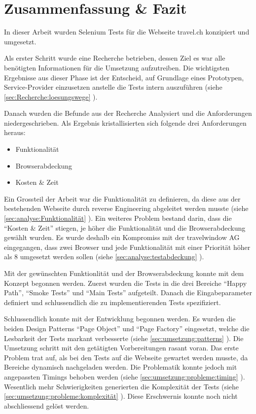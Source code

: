 
\chapter{Zusammenfassung \& Fazit}
In dieser Arbeit wurden Selenium Tests für die Webseite travel.ch konzipiert und umgesetzt. 

Als erster Schritt wurde eine Recherche betrieben, dessen Ziel es war alle benötigten Informationen für die Umsetzung aufzutreiben. Die wichtigsten Ergebnisse aus dieser Phase ist der Entscheid, auf Grundlage eines Prototypen, Service-Provider einzusetzen anstelle die Tests intern auszuführen (siehe \cref{sec:Recherche:loesungswege} ). 

Danach wurden die Befunde aus der Recherche Analysiert und die Anforderungen niedergeschrieben. Als Ergebnis kristallisierten sich folgende drei Anforderungen heraus:
\begin{itemize}
\item Funktionalität
\item Browserabdeckung
\item Kosten \& Zeit
\end{itemize}
Ein Grossteil der Arbeit war die Funktionalität zu definieren, da diese aus der bestehenden Webseite durch reverse Engineering abgeleitet werden musste (siehe \cref{sec:analyse:Funktionalität} ). Ein weiteres Problem bestand darin, dass die "`Kosten \& Zeit"' stiegen, je höher die Funktionalität und die Browserabdeckung gewählt wurden. Es wurde deshalb ein Kompromiss mit der travelwindow AG eingegangen, dass zwei Browser und jede Funktionalität mit einer Priorität höher als 8 umgesetzt werden sollen (siehe  \cref{sec:analyse:testabdeckung} ).

Mit der gewünschten Funktionlität und der Browserabdeckung konnte mit dem Konzept begonnen werden. Zuerst wurden die Tests in die drei Bereiche "`Happy Path"', "`Smoke Tests"' und "`Main Tests"' aufgeteilt. Danach die Eingabeparameter definiert und schlussendlich die zu implementierenden Tests spezifiziert.

Schlussendlich konnte mit der Entwicklung begonnen werden. Es wurden die beiden Design Patterns "`Page Object"' und "`Page Factory"' eingesetzt, welche die Lesbarkeit der Tests markant verbesserte (siehe \cref{sec:umsetzung:patterns} ). Die Umsetzung schritt mit den getätigten Vorbereitungen rasant voran. Das erste Problem trat auf, als bei den Tests auf die Webseite gewartet werden musste, da Bereiche dynamisch nachgeladen werden. Die Problematik konnte jedoch mit angepassten Timings behoben werden (siehe \cref{sec:umsetzung:probleme:timing} ). Wesentlich mehr Schwierigkeiten generierten die Komplexität der Tests (siehe \cref{sec:umsetzung:probleme:komplexität} ). Diese Erschwernis konnte noch nicht abschliessend gelöst werden.


